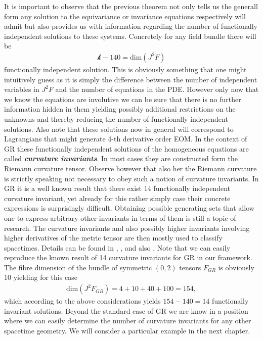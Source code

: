 \documentclass[a4paper,12pt, DIV=14, BCOR=5mm, twoside, headsepline]{scrbook}
\begin{document}
It is important to observe that the previous theorem not only tells us the generall form any solution to the equivariance or invariance equations respectively will admit but also provides us with information regarding the number of functionally independent solutions to these systems. Concretely for any field bundle there will be 
\begin{align}
    \mathcal{k} - 140 = \mathrm{dim}(J^2F)
\end{align}
functionally independent solution. This is obviously something that one might intuitively guess as it is simply the difference between the number of independent variables in $J^2F$ and the number of equations in the PDE. However only now that we know the equations are involutive we can be sure that there is no further information hidden in them yielding possibly additional restrictions on the unknowns and thereby reducing the number of functionally independent solutions. 
Also note that these solutions now in general will correspond to Lagrangians that might generate 4-th derivative order EOM. 
In the context of GR these functionally independent solutions of the homogeneous equations are called \textit{\textbf{curvature invariants}}. In most cases they are constructed form the Riemann curvature tensor. Observe however that also her the Riemann curvature is strictly speaking not necessary to obey such a notion of curvature invariants. 
In GR it is a well known result that there exist 14 functionally independent curvature invariant, yet already for this rather simply case their concrete expressions is surprisingly difficult. Obtaining possible generating sets that allow one to express arbitrary other invariants in terms of them is still a topic of research. The curvature invariants and also possibly higher invariants involving higher derivatives of the metric tensor are then mostly used to classify spacetimes. Details can be found in
\cite{2009CQGra..26b5013C}, \cite{Zakhary1997}, \cite{2002IJMPD..11..827C} and also \cite{doi:10.1063/1.531425}.
Note that we can easily reproduce the known result of 14 curvature invariants for GR in our framework. The fibre dimension of the bundle of symmetric $(0,2)$ tensors $F_{GR}$ is obviously 10 yielding for this case 
\begin{align}
    \mathrm{dim}(J^2F_{GR}) = 4 + 10 + 40 + 100 = 154,
\end{align}
which according to the above considerations yields $154-140=14$ functionally invariant solutions. Beyond the standard case of GR we are know in a position where we can easily determine the number of curvature invariants for any other spacetime geometry. We will consider a particular example in the next chapter.\\ 
\end{document}
